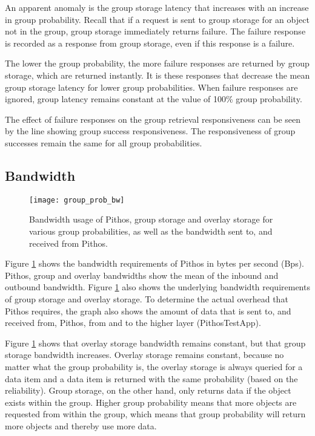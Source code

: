 An apparent anomaly is the group storage latency that increases with an increase in group probability. Recall that if a request is sent to group storage for an object not in the group, group storage immediately returns failure. The failure response is recorded as a response from group storage, even if this response is a failure.

The lower the group probability, the more failure responses are returned by group storage, which are returned instantly. It is these responses that decrease the mean group storage latency for lower group probabilities. When failure responses are ignored, group latency remains constant at the value of 100\% group probability.

The effect of failure responses on the group retrieval responsiveness can be seen by the line showing group success responsiveness. The responsiveness of group successes remain the same for all group probabilities.

\subsection{Bandwidth}
\label{group_probability_bandwidth}

\begin{figure}[htbp]
 \centering
 \texttt{[image: group\_prob\_bw]}
 \caption{Bandwidth usage of Pithos, group storage and overlay storage for various group probabilities, as well as the bandwidth sent to, and received from Pithos.}
 \label{fig_group_prob_bw}
\end{figure}
%
Figure \ref{fig_group_prob_bw} shows the bandwidth requirements of Pithos in bytes per second (Bps). Pithos, group and overlay bandwidths show the mean of the inbound and outbound bandwidth. Figure \ref{fig_group_prob_bw} also shows the underlying bandwidth requirements of group storage and overlay storage. To determine the actual overhead that Pithos requires, the graph also shows the amount of data that is sent to, and received from, Pithos, from and to the higher layer (PithosTestApp).

Figure \ref{fig_group_prob_bw} shows that overlay storage bandwidth remains constant, but that group storage bandwidth increases. Overlay storage remains constant, because no matter what the group probability is, the overlay storage is always queried for a data item and a data item is returned with the same probability (based on the reliability). Group storage, on the other hand, only returns data if the object exists within the group. Higher group probability means that more objects are requested from within the group, which means that group probability will return more objects and thereby use more data.

